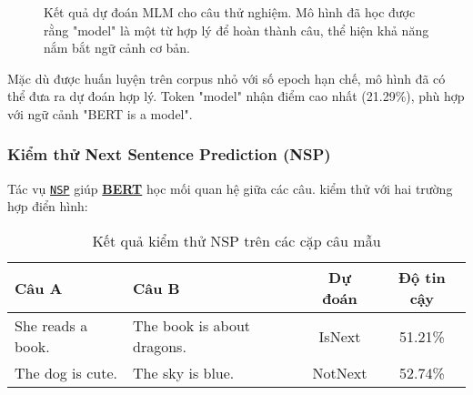 \begin{figure}[H]
\centering
{}
\caption{Kết quả dự đoán MLM cho câu thử nghiệm. Mô hình đã học được rằng "model" là một từ hợp lý để hoàn thành câu, thể hiện khả năng nắm bắt ngữ cảnh cơ bản.}
\label{fig:mlm_test_results}
\end{figure}

Mặc dù được huấn luyện trên corpus nhỏ với số epoch hạn chế, mô hình đã có thể đưa ra dự đoán hợp lý. Token "model" nhận điểm cao nhất (21.29\%), phù hợp với ngữ cảnh "BERT is a model".

\subsubsection{Kiểm thử Next Sentence Prediction (NSP)}

Tác vụ \hyperref[acro:nsp]{\texttt{NSP}} giúp \hyperref[acro:bert]{\textbf{BERT}} học mối quan hệ giữa các câu. kiểm thử với hai trường hợp điển hình:

\begin{table}[H]
\centering
\caption{Kết quả kiểm thử NSP trên các cặp câu mẫu}
\label{tab:nsp_test_results}
\begin{tabular}{p{3cm}p{3cm}cc}
\toprule
\textbf{Câu A} & \textbf{Câu B} & \textbf{Dự đoán} & \textbf{Độ tin cậy} \\
\midrule
She reads a book. & The book is about dragons. & IsNext & 51.21\% \\
The dog is cute. & The sky is blue. & NotNext & 52.74\% \\
\bottomrule
\end{tabular}
\end{table}

